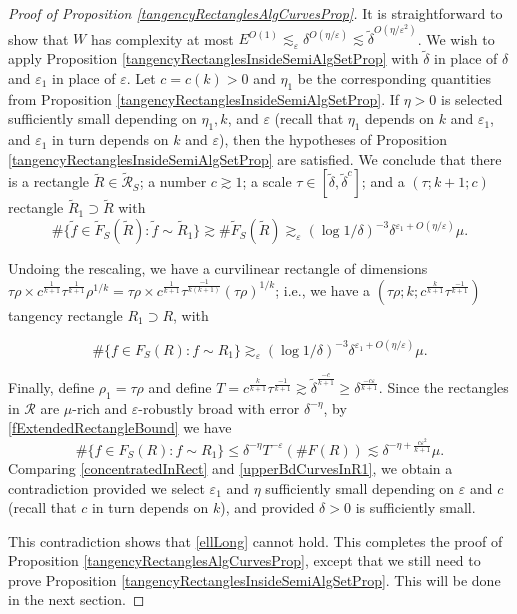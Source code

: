 \documentclass[letterpaper, reqno,11pt]{article}
\numberwithin{equation}{section}
\newcommand{\eps}{\varepsilon}
\numberwithin{thm}{section}
\theoremstyle{remark}
\begin{document}
\begin{proof}[Proof of Proposition \ref{tangencyRectanglesAlgCurvesProp}]
It is straightforward to show that $W$ has complexity at most $E^{O(1)}\lesssim_\eps \delta^{O(\eta/\eps)}\lesssim \tilde\delta^{O(\eta/\eps^2)}$. We wish to apply Proposition \ref{tangencyRectanglesInsideSemiAlgSetProp} with $\tilde\delta$ in place of $\delta$ and $\eps_1$ in place of $\eps$. Let $c=c(k)>0$ and $\eta_1$ be the corresponding quantities from  Proposition \ref{tangencyRectanglesInsideSemiAlgSetProp}. If $\eta>0$ is selected sufficiently small depending on $\eta_1,k$, and $\eps$ (recall that $\eta_1$ depends on $k$ and $\eps_1$, and $\eps_1$ in turn depends on $k$ and $\eps$), then the hypotheses of Proposition \ref{tangencyRectanglesInsideSemiAlgSetProp} are satisfied. We conclude that there is a rectangle $\tilde R \in \tilde{\mathcal{R}}_S$; a number $c\gtrsim 1$; a scale $\tau\in [\tilde\delta,\tilde\delta^{c}]$; and a $(\tau;k+1; c)$ rectangle $\tilde R_1\supset\tilde R$ with
\begin{equation}\label{cardinalityBdTildeFPrimeS}
\# \{ \tilde f\in \tilde F_S(\tilde R)\colon \tilde f\sim \tilde R_1\} \gtrsim \# \tilde F_S(\tilde R) \gtrsim_\eps (\log1/\delta)^{-3}\delta^{\eps_1+O(\eta/\eps)}\mu.
\end{equation}

Undoing the rescaling, we have a curvilinear rectangle of dimensions $\tau\rho\times c^{\frac{1}{k+1}}\tau^{\frac{1}{k+1}}\rho^{1/k}=\tau\rho\times c^{\frac{1}{k+1}}\tau^{\frac{-1}{k(k+1)}}(\tau\rho)^{1/k}$; i.e., we have a $(\tau\rho; k; c^{\frac{k}{k+1}}\tau^{\frac{-1}{k+1}})$ tangency rectangle $R_1\supset R$, with 

\begin{equation}\label{concentratedInRect}
\# \{ f\in  F_S( R)\colon f\sim  R_1\}\gtrsim_\eps (\log1/\delta)^{-3}\delta^{\eps_1+O(\eta/\eps)}\mu.
\end{equation}

Finally, define $\rho_1 =\tau\rho$ and define $T=c^{\frac{k}{k+1}}\tau^{\frac{-1}{k+1}}\gtrsim \tilde\delta^{\frac{-c}{k+1}} \geq \delta^{\frac{-c \eps}{k+1}}$. Since the rectangles in $\mathcal{R}$ are $\mu$-rich and $\eps$-robustly broad with error $\delta^{-\eta}$, by \eqref{fExtendedRectangleBound} we have
\begin{equation}\label{upperBdCurvesInR1}
\# \{ f\in  F_S( R)\colon f\sim  R_1\} \leq \delta^{-\eta}T^{-\eps}(\#F(R)) \lesssim \delta^{-\eta+\frac{c \eps^2}{k+1}}\mu.
\end{equation}
Comparing \eqref{concentratedInRect} and \eqref{upperBdCurvesInR1}, we obtain a contradiction provided we select $\eps_1$ and $\eta$ sufficiently small depending on $\eps$ and $c$ (recall that $c$ in turn depends on $k$), and provided $\delta>0$ is sufficiently small. 

This contradiction shows that \eqref{ellLong} cannot hold. This completes the proof of Proposition \ref{tangencyRectanglesAlgCurvesProp}, except that we still need to prove Proposition \ref{tangencyRectanglesInsideSemiAlgSetProp}. This will be done in the next section. 
\end{proof}
\end{document}
